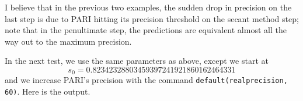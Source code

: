 \documentclass[]{article}
\begin{document}
I believe that in the previous two examples, the sudden drop in precision on the last step is due to PARI hitting its precision threshold on the secant method step; note that in the penultimate step, the predictions are equivalent almost all the way out to the maximum precision.

In the next test, we use the same parameters as above, except we start at
$$
s_0 = 0.82342328803459397241921860162464331
$$
and we increase PARI's precision with the command \verb|default(realprecision, 60)|.
Here is the output.
\end{document}
